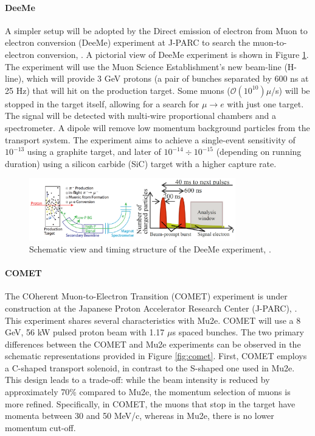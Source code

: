 \paragraph{DeeMe}
A simpler setup will be adopted 
by the Direct emission of electron 
from Muon to electron conversion (DeeMe) 
experiment at J-PARC to search 
the muon-to-electron conversion, \cite{deeme}.
A pictorial view of DeeMe experiment is shown in Figure 
\ref{fig:deeme}.
The experiment will use the Muon 
Science Establishment's new beam-line (H-line), 
which will provide 3 GeV protons 
(a pair of bunches separated by 600 ns at 25 Hz) 
that will hit on the production target. 
Some muons ($\mathcal{O}(10^{10})\mu$/s) 
will be stopped in the target itself, 
allowing for a search for $\mu \rightarrow e$ 
with just one target. The signal will be detected 
with multi-wire proportional chambers and a 
spectrometer. 
A dipole will remove low momentum background 
particles from the transport system. 
The experiment aims to achieve a single-event 
sensitivity of $10^{-13}$ using a graphite target, 
and later of $10^{-14} \div 10^{-15}$ 
(depending on running duration) using a 
silicon carbide (SiC) target with a higher 
capture rate. 
\begin{figure}[!h]
    \centering
    \includegraphics[width =0.8\textwidth]{figures/png/Screenshot_20240322_101840.png}
    \caption[DeeMe experiment.]{Schematic view 
    and timing structure of the DeeMe experiment, \cite{deeme}.}
    \label{fig:deeme}
\end{figure}
\paragraph{COMET}
The COherent Muon-to-Electron 
Transition (COMET) experiment is 
under construction at
the Japanese Proton Accelerator 
Research Center (J-PARC), \cite{Abramishvili_2020}. 
This experiment shares several 
characteristics with Mu2e. COMET 
will use a 8 GeV, 56 kW pulsed proton beam
with 1.17 $\mu$s spaced bunches. 
The two primary differences between 
the COMET and Mu2e experiments can 
be observed in the schematic representations 
provided in Figure \ref{fig:comet}. First, 
COMET employs a C-shaped transport solenoid, 
in contrast to the S-shaped one used in Mu2e. 
This design leads to a trade-off: while the 
beam intensity is reduced by approximately 
70\% compared to Mu2e, the momentum selection 
of muons is more refined. Specifically, in 
COMET, the muons that stop in the target 
have momenta between 30 and 50 MeV/c, whereas 
in Mu2e, there is no lower momentum cut-off. 


